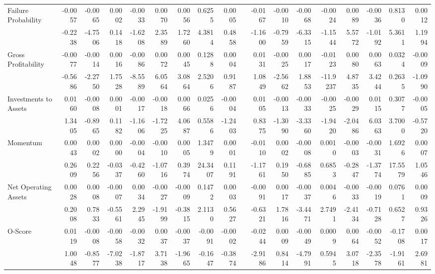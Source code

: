 \begin{table}[htbp]
{\begin{tabular}{lrrrrrrrrrrrrrrrrr}
      Failure Probability & -0.0057 & -0.0065 & 0.0002 & -0.0033 & 0.0070 & 0.0056 & 0.6255 & 0.0005 &       & -0.0167 & -0.0010 & -0.0068 & -0.0024 & 0.0089 & -0.0036 & 0.8130 & 0.0012 \\
            & -0.2238 & -4.7506 & 0.1418 & -1.6208 & 2.3589 & 1.7260 & 4.3814 & 0.4858 &       & -1.1600 & -0.7959 & -6.3315 & -1.1544 & 5.5772 & -1.0192 & 5.3611 & 1.1994 \\
      Gross Profitability & -0.0077 & -0.0014 & 0.0016 & -0.0086 & 0.0072 & 0.0045 & 0.1288 & 0.0004 &       & 0.0131 & -0.0025 & 0.0017 & -0.0123 & 0.0080 & 0.0063 & 0.0324 & -0.0009 \\
            & -0.5686 & -2.2750 & 1.7528 & -8.5589 & 6.0564 & 3.0864 & 2.5206 & 0.9187 &       & 1.0849 & -2.5662 & 1.8853 & -11.9237 & 4.8735 & 3.4244 & 0.2635 & -1.0990 \\
      Investments to Assets & 0.0160 & -0.0008 & 0.0001 & -0.0017 & -0.0018 & 0.0066 & 0.0256 & -0.0004 &       & 0.0105 & -0.0013 & -0.0033 & -0.0025 & -0.0029 & 0.0115 & 0.3077 & -0.0005 \\
            & 1.3405 & -0.8965 & 0.1182 & -1.1606 & -1.7225 & 4.0687 & 0.5586 & -1.2403 &       & 0.8375 & -1.3090 & -3.3360 & -1.9420 & -2.0486 & 6.0363 & 3.7000 & -0.5720 \\
      Momentum & 0.0043 & 0.0002 & 0.0000 & -0.0004 & -0.0010 & 0.0005 & 1.3479 & 0.0001 &       & -0.0110 & 0.0002 & -0.0008 & 0.0010 & -0.0003 & -0.0031 & 1.6926 & 0.0007 \\
            & 0.2609 & 0.2256 & -0.0337 & -0.4260 & -1.0716 & 0.3974 & 24.3407 & 0.1191 &       & -1.1761 & 0.1950 & -0.6885 & 0.6853 & -0.2847 & -1.3774 & 17.5579 & 1.0546 \\
      Net Operating Assets & 0.0028 & 0.0008 & -0.0007 & 0.0034 & -0.0027 & -0.0009 & 0.1472 & 0.0003 &       & -0.0091 & 0.0017 & -0.0037 & 0.0046 & -0.0033 & -0.0019 & 0.0761 & 0.0009 \\
            & 0.2008 & 0.7833 & -0.5561 & 2.2945 & -1.9199 & -0.3815 & 2.1130 & 0.5627 &       & -0.6321 & 1.7816 & -3.4471 & 2.7491 & -2.4134 & -0.7128 & 0.6527 & 0.9326 \\
      O-Score & 0.0119 & -0.0008 & -0.0058 & -0.0032 & 0.0037 & -0.0037 & -0.0091 & -0.0002 &       & -0.0244 & 0.0009 & -0.0049 & 0.0009 & 0.0064 & -0.0052 & -0.1708 & 0.0017 \\
            & 1.0048 & -0.8577 & -7.0238 & -1.8717 & 3.7138 & -1.9665 & -0.1647 & -0.3874 &       & -2.9186 & 0.8414 & -4.7991 & 0.5945 & 3.0718 & -2.3578 & -1.9161 & 2.6981 \\

\end{tabular}}
\end{table}
